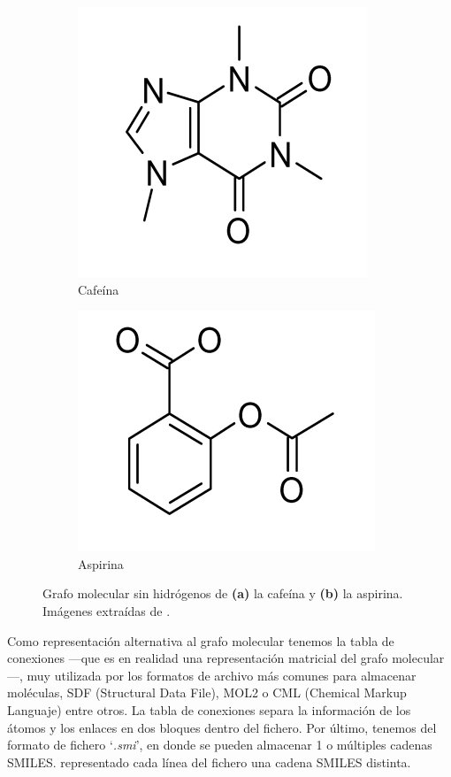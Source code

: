 \begin{figure}[h!]
\centering
\begin{subfigure}{.5\textwidth}
  \centering
  \includegraphics[width=.7\linewidth]{imagenes/estado_arte/teoria/cafeina.png}
  \caption{Cafeína}
\end{subfigure}%
\begin{subfigure}{.5\textwidth}
  \centering
  \includegraphics[width=.7\linewidth]{imagenes/estado_arte/teoria/aspirina.png}
  \caption{Aspirina}
\end{subfigure}
\caption{Grafo molecular sin hidrógenos de \textbf{(a)} la cafeína y \textbf{(b)} la aspirina. Imágenes extraídas de \cite{brown_chemoinformaticsintroduction_2009}.}
\label{fig:grafo_molecular_caf_asp}
\end{figure}


Como representación alternativa al grafo molecular tenemos la tabla de conexiones —que es en realidad una representación matricial del grafo molecular—, muy utilizada por los formatos de archivo más comunes para almacenar moléculas, SDF (Structural Data File), MOL2 o CML (Chemical Markup Languaje) entre otros. La tabla de conexiones separa la información de los átomos y los enlaces en dos bloques dentro del fichero. Por último, tenemos del formato de fichero `\textit{.smi}', en donde se pueden almacenar 1 o múltiples cadenas SMILES. representado cada línea del fichero una cadena SMILES distinta.

